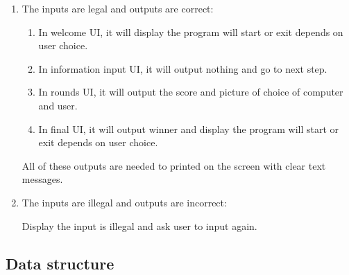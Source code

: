\documentclass[12pt]{article}
\begin{document}
	\begin{enumerate}
		\item The inputs are legal and outputs are correct:
	
		\begin{enumerate}[1)]
			\item In welcome UI, it will display the program will start or exit depends on user choice.
			\item In information input UI, it will output nothing and go to next step.
			\item In rounds UI, it will output the score and picture of choice of computer and user.
			\item In final UI, it will output winner and display the program will start or exit depends on user choice.
		\end{enumerate}
		
		All of these outputs are needed to printed on the screen with clear text messages.
	
		\item The inputs are illegal and outputs are incorrect:
		
		Display the input is illegal and ask user to input again.
	\end{enumerate}

	\subsection{Data structure}
	
\end{document}
